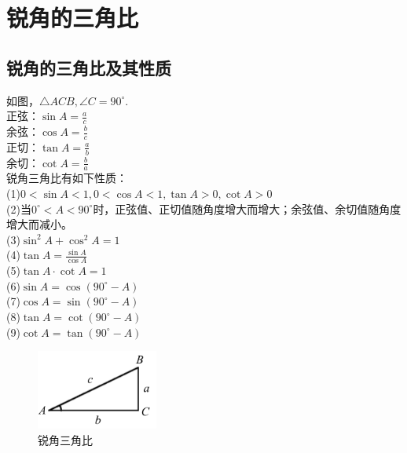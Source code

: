 \documentclass{ecnuthesis}
\begin{document}
\chapter{锐角的三角比}
\section{锐角的三角比及其性质}
\begin{knowledge}
    如图，$\triangle ACB,\angle C=90^\circ$. \\
    正弦：$\sin A=\frac{a}{c}$ \\
    余弦：$\cos A=\frac{b}{c}$ \\
    正切：$\tan A=\frac{a}{b}$ \\
    余切：$\cot A=\frac{b}{a}$ \\
    锐角三角比有如下性质：\\
    (1)$0 < \sin A < 1, 0 < \cos A < 1, \tan A > 0, \cot A > 0$ \\
    (2)当$0^\circ < A < 90^\circ$时，正弦值、正切值随角度增大而增大；余弦值、余切值随角度增大而减小。\\
    (3)$\sin^2 A+\cos^2 A=1$ \\
    (4)$\tan A=\frac{\sin A}{\cos A}$ \\
    (5)$\tan A·\cot A=1$ \\
    (6)$\sin A=\cos(90^\circ-A)$ \\
    (7)$\cos A=\sin(90^\circ-A)$ \\
    (8)$\tan A=\cot(90^\circ-A)$ \\
    (9)$\cot A=\tan(90^\circ-A)$ \\
\end{knowledge}
\begin{figure}[H]
\centering
\includegraphics[width=4cm]{picture/901.png}
\caption{锐角三角比}
\end{figure}
\clearpage
\end{document}

